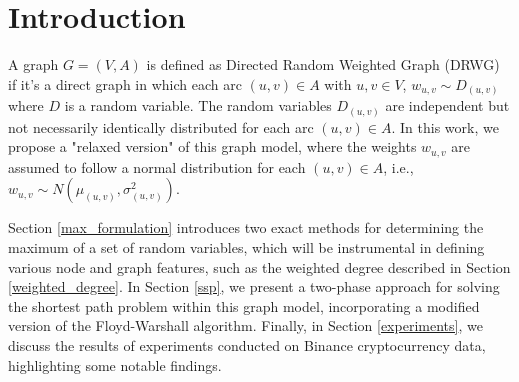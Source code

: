 \section{Introduction}

A graph \( G = (V, A) \) is defined as Directed Random Weighted Graph (DRWG) if it's a direct graph in which each arc $(u,v) \in A$ with $u,v \in V$, $w_{u,v} \sim D_{(u,v)}$ where $D$ is a random variable. The random variables $D_{(u,v)}$ are independent but not necessarily identically distributed for each arc $(u,v) \in A$. In this work, we propose a "relaxed version" of this graph model, where the weights $w_{u,v}$ are assumed to follow a normal distribution for each $(u,v) \in A$, i.e., $w_{u,v} \sim N(\mu_{(u,v)}, \sigma^2_{(u,v)})$.

Section \ref{max_formulation} introduces two exact methods for determining the maximum of a set of random variables, which will be instrumental in defining various node and graph features, such as the weighted degree described in Section \ref{weighted_degree}. In Section \ref{ssp}, we present a two-phase approach for solving the shortest path problem within this graph model, incorporating a modified version of the Floyd-Warshall algorithm. Finally, in Section \ref{experiments}, we discuss the results of experiments conducted on Binance cryptocurrency data, highlighting some notable findings.

